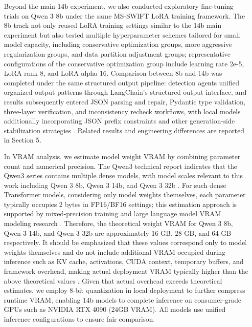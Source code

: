 \documentclass[11pt]{article}
\begin{document}
Beyond the main 14b experiment, we also conducted exploratory fine-tuning trials on Qwen 3 8b under the same MS-SWIFT LoRA training framework. The 8b track not only reused LoRA training settings similar to the 14b main experiment but also tested multiple hyperparameter schemes tailored for small model capacity, including conservative optimization groups, more aggressive regularization groups, and data partition adjustment groups; representative configurations of the conservative optimization group include learning rate 2e-5, LoRA rank 8, and LoRA alpha 16. Comparison between 8b and 14b was completed under the same structured output pipeline: detection agents unified organized output patterns through LangChain's structured output interface, and results subsequently entered JSON parsing and repair, Pydantic type validation, three-layer verification, and inconsistency recheck workflows, with local models additionally incorporating JSON prefix constraints and other generation-side stabilization strategies \citep{chase2023langchain,langchain2024structuredOutput}. Related results and engineering differences are reported in Section 5.

In VRAM analysis, we estimate model weight VRAM by combining parameter count and numerical precision. The Qwen3 technical report indicates that the Qwen3 series contains multiple dense models, with model scales relevant to this work including Qwen 3 8b, Qwen 3 14b, and Qwen 3 32b \citep{yang2025qwen3TechnicalReport}. For such dense Transformer models, considering only model weights themselves, each parameter typically occupies 2 bytes in FP16/BF16 settings; this estimation approach is supported by mixed-precision training and large language model VRAM modeling research \citep{micikevicius2018mixedPrecision,fujii2024memoryConsumptionEstimator,kim2024llmem}. Therefore, the theoretical weight VRAM for Qwen 3 8b, Qwen 3 14b, and Qwen 3 32b are approximately 16 GB, 28 GB, and 64 GB respectively. It should be emphasized that these values correspond only to model weights themselves and do not include additional VRAM occupied during inference such as KV cache, activations, CUDA context, temporary buffers, and framework overhead, making actual deployment VRAM typically higher than the above theoretical values \citep{fujii2024memoryConsumptionEstimator,kim2024llmem}. Given that actual overhead exceeds theoretical estimates, we employ 8-bit quantization in local deployment to further compress runtime VRAM, enabling 14b models to complete inference on consumer-grade GPUs such as NVIDIA RTX 4090 (24GB VRAM). All models use unified inference configurations to ensure fair comparison.
\end{document}
